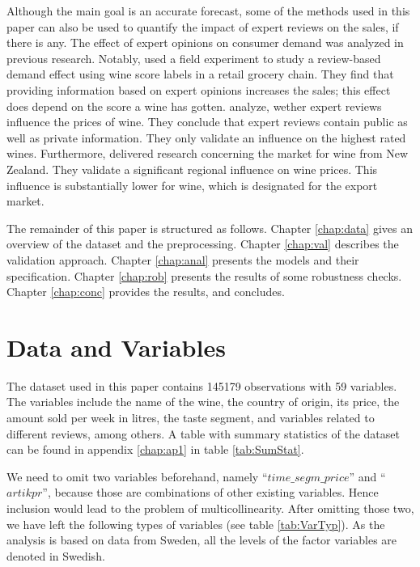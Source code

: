 \documentclass[11pt,]{article}
\begin{document}
Although the main goal is an accurate forecast, some of the methods used
in this paper can also be used to quantify the impact of expert reviews
on the sales, if there is any. The effect of expert opinions on consumer
demand was analyzed in previous research. Notably,
\textcite[][]{Hilger2011} used a field experiment to study a
review-based demand effect using wine score labels in a retail grocery
chain. They find that providing information based on expert opinions
increases the sales; this effect does depend on the score a wine has
gotten. \textcite[][]{Ashenfelter2013} analyze, wether expert reviews
influence the prices of wine. They conclude that expert reviews contain
public as well as private information. They only validate an influence
on the highest rated wines. Furthermore, \textcite[][]{Bicknell2012}
delivered research concerning the market for wine from New Zealand. They
validate a significant regional influence on wine prices. This influence
is substantially lower for wine, which is designated for the export
market.

The remainder of this paper is structured as follows. Chapter
\ref{chap:data} gives an overview of the dataset and the preprocessing.
Chapter \ref{chap:val} describes the validation approach. Chapter
\ref{chap:anal} presents the models and their specification. Chapter
\ref{chap:rob} presents the results of some robustness checks. Chapter
\ref{chap:conc} provides the results, and concludes.

\hypertarget{data-and-variables}{%
\section{\texorpdfstring{Data and Variables
\label{chap:data}}{Data and Variables }}\label{data-and-variables}}

The dataset used in this paper contains 145179 observations with 59
variables. The variables include the name of the wine, the country of
origin, its price, the amount sold per week in litres, the taste
segment, and variables related to different reviews, among others. A
table with summary statistics of the dataset can be found in appendix
\ref{chap:ap1} in table \ref{tab:SumStat}.

We need to omit two variables beforehand, namely
\enquote{\(time\_segm\_price\)} and \enquote{\(artikpr\)}, because those
are combinations of other existing variables. Hence inclusion would lead
to the problem of multicollinearity. After omitting those two, we have
left the following types of variables (see table \ref{tab:VarTyp}). As
the analysis is based on data from Sweden, all the levels of the factor
variables are denoted in Swedish.
\end{document}

